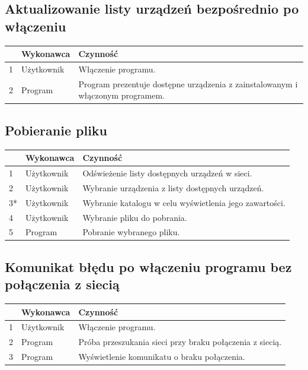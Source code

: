 \documentclass[12pt,a4paper]{article}
\begin{document}
\begin{center}
\subsection{Aktualizowanie listy urządzeń bezpośrednio po włączeniu}
	\begin{tabular}{|l|p{5em}|p{30em}|}
	\hline 
	 & Wykonawca & Czynność \\ 
	\hline
	1 & Użytkownik & Włączenie programu. \\
	\hline
	2 & Program & Program prezentuje dostępne urządzenia z zainstalowanym i włączonym programem. \\
	\hline
\end{tabular}
	
\subsection{Pobieranie pliku}
\begin{tabular}{|l|p{5em}|p{30em}|}
	\hline 
	 & Wykonawca & Czynność \\
	\hline 
	1 & Użytkownik & Odświeżenie listy dostępnych urządzeń w sieci. \\ 
	\hline 
	2 & Użytkownik & Wybranie urządzenia z listy dostępnych urządzeń. \\ 
	\hline 
	3* & Użytkownik & Wybranie katalogu w celu wyświetlenia jego zawartości. \\
	\hline
	4 & Użytkownik & Wybranie pliku do pobrania. \\
	\hline
	5 & Program & Pobranie wybranego pliku. \\
	\hline
\end{tabular} 
	
\subsection{Komunikat błędu po włączeniu programu bez połączenia z siecią}
\begin{tabular}{|l|p{5em}|p{30em}|}
	\hline 
	 & Wykonawca & Czynność \\
	\hline
	1 & Użytkownik & Włączenie programu. \\
	\hline
	2 & Program & Próba przeszukania sieci przy braku połączenia z siecią. \\
	\hline
	3 & Program & Wyświetlenie komunikatu o braku połączenia. \\
	\hline
\end{tabular}


\end{center}
\end{document}
